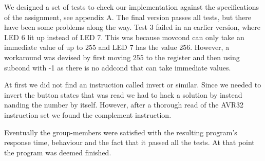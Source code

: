 We designed a set of tests to check our implementation against the specifications of the assignment, see appendix A. The final version passes all tests, but there have been some problems along the way. Test 3 failed in an earlier version, where LED 6 lit up instead of LED 7. This was because mov{cond} can only take an immediate value of up to 255 and LED 7 has the value 256. However, a workaround was devised by first moving 255 to the register and then using sub{cond} with -1 as there is no add{cond} that can take immediate values.

At first we did not find an instruction called invert or similar. Since we needed to invert the button states that was read we had to hack a solution by instead nanding the number by itself. However, after a thorough read of the AVR32 instruction set \cite[Section~9]{avr32} we found the complement instruction.

Eventually the group-members were satisfied with the resulting program’s response time, behaviour and the fact that it passed all the tests. At that point the program was deemed finished.
